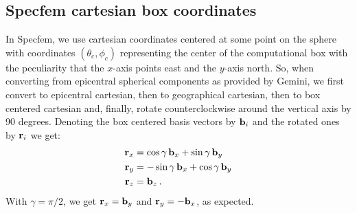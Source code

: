 \documentclass[12pt,a4paper]{article}
\renewcommand{\v}[1]{{\bf #1}}
\begin{document}
\subsection{Specfem cartesian box coordinates}
In Specfem, we use cartesian coordinates centered at some point on the sphere with coordinates $(\theta_c,\phi_c)$ representing the center of the computational box with the peculiarity that the $x$-axis points east and the $y$-axis north. So, when converting from epicentral spherical components as provided by Gemini, we first convert to epicentral cartesian, then to geographical cartesian, then to box centered cartesian and, finally, rotate counterclockwise around the vertical axis by 90 degrees. Denoting the box centered basis vectors by $\v{b}_i$ and the rotated ones by $\v{r}_i$ we get:
\begin{align}
\v{r}_x &= \cos\gamma\,\v{b}_x + \sin\gamma\,\v{b}_y \notag \\
\v{r}_y &= -\sin\gamma\,\v{b}_x + \cos\gamma\,\v{b}_y \notag \\
\v{r}_z &= \v{b}_z  \,.
\end{align}
With $\gamma=\pi/2$, we get $\v{r}_x = \v{b}_y$ and $\v{r}_y = -\v{b}_x$, as expected.
\end{document}
